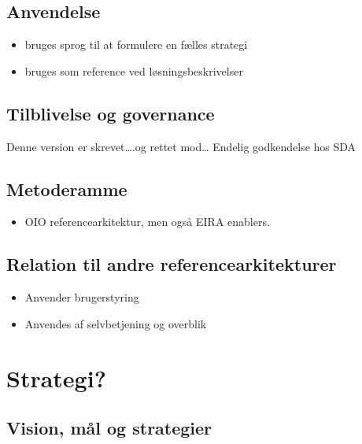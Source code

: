 \subsection{Anvendelse}\label{anvendelse}

\begin{itemize}
\tightlist
\item
  bruges sprog til at formulere en fælles strategi
\item
  bruges som reference ved løsningsbeskrivelser
\end{itemize}

\subsection{Tilblivelse og governance}\label{tilblivelse-og-governance}

Denne version er skrevet\ldots{}.og rettet mod\ldots{} Endelig
godkendelse hos SDA

\subsection{Metoderamme}\label{metoderamme}

\begin{itemize}
\tightlist
\item
  OIO referencearkitektur, men også EIRA enablers.
\end{itemize}

\subsection{Relation til andre
referencearkitekturer}\label{relation-til-andre-referencearkitekturer}

\begin{itemize}
\tightlist
\item
  Anvender brugerstyring
\item
  Anvendes af selvbetjening og overblik
\end{itemize}

\section{Strategi?}\label{strategi}

\subsection{Vision, mål og
strategier}\label{vision-muxe5l-og-strategier}

